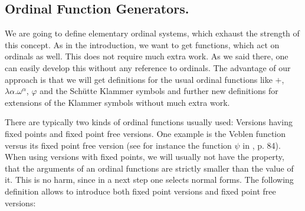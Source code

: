 \documentclass[10pt]{article}
\begin{document}
\subsection{Ordinal Function Generators.}

We are going to define elementary 
ordinal systems, which exhaust the strength of this concept. 
As in the introduction, we
want to get functions, which act on ordinals as well. This does not
require much extra work. As we said there, one can easily develop this
without any reference to ordinals.
The advantage of our approach is that we will get 
definitions for the usual ordinal functions like
$+$, $\lambda \alpha.\omega^\alpha$, $\varphi$ and the Sch{\"u}tte
Klammer symbols and further new definitions for 
extensions of the Klammer symbols without much extra work.\par 
There are typically two kinds of ordinal functions usually used: 
Versions having
fixed points and fixed point free versions. One example is
the Veblen function versus its fixed point free version (see for instance 
the function $\psi$ in \cite{schuettebook}, p. 84). 
When using versions with fixed points, we will usually not have the 
property, that the arguments of an ordinal functions
are strictly smaller than the value of it. This is no harm, since
in a next step one selects normal forms.
The following definition allows to introduce both fixed point versions and
fixed point free versions:
%
%
%
%
%
%
\end{document}
